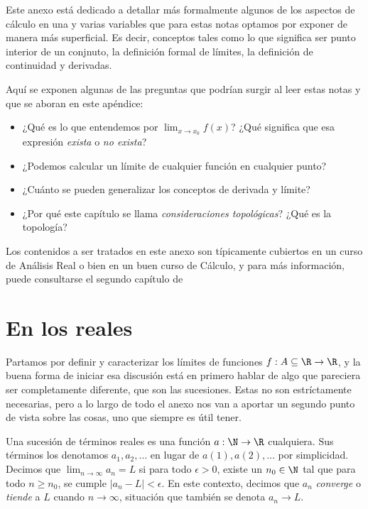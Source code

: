 Este anexo está dedicado a detallar más formalmente algunos de los aspectos de cálculo en una y varias variables que para estas notas optamos por exponer de manera más superficial. Es decir, conceptos tales como lo que significa ser punto interior de un conjnuto, la definición formal de límites, la definición de continuidad y derivadas.

Aquí se exponen algunas de las preguntas que podrían surgir al leer estas notas y que se aboran en este apéndice:
\begin{itemize}
    \item ¿Qué es lo que entendemos por $\lim_{x \to x_0} f(x)$? ¿Qué significa que esa expresión \textit{exista} o \textit{no exista}?
    \item ¿Podemos calcular un límite de cualquier función en cualquier punto?
    \item ¿Cuánto se pueden generalizar los conceptos de derivada y límite?
    \item ¿Por qué este capítulo se llama \textit{consideraciones topológicas}? ¿Qué es la topología?
\end{itemize}

Los contenidos a ser tratados en este anexo son típicamente cubiertos en un curso de Análisis Real o bien en un buen curso de Cálculo, y para más información, puede consultarse el segundo capítulo de \cite{Kolmogorov}

\section{En los reales}

Partamos por definir y caracterizar los límites de funciones $f: A \subseteq \R \to \R$, y la buena forma de iniciar esa discusión está en primero hablar de algo que pareciera ser completamente diferente, que son las sucesiones. Estas no son estríctamente necesarias, pero a lo largo de todo el anexo nos van a aportar un segundo punto de vista sobre las cosas, uno que siempre es útil tener.

\begin{definition}
    Una sucesión de términos reales es una función $a: \N \to \R$ cualquiera. Sus términos los denotamos $a_1, a_2, \dots$ en lugar de $a(1), a(2), \dots$ por simplicidad. Decimos que $\lim_{n \to \infty} a_n = L$ si para todo $\epsilon > 0$, existe un $n_0 \in \N$ tal que para todo $n \geq n_0$, se cumple $|a_n - L| < \epsilon$. En este contexto, decimos que $a_n$ \textit{converge} o \textit{tiende} a $L$ cuando $n \to \infty$, situación que también se denota $a_n \to L$.
\end{definition}

